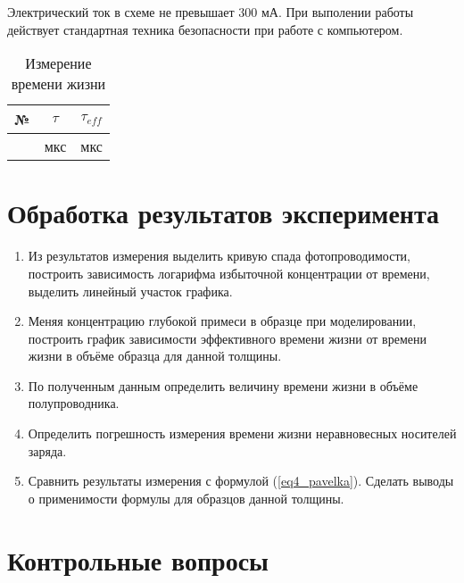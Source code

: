 Электрический ток в схеме не превышает 300 мА. При выполении работы действует стандартная техника безопасности при работе с компьютером.

\begin{table}[h!]
\caption{Измерение времени жизни}
\begin{center}
\begin{tabular}{c|c|c}
№ & $\tau$ & $\tau_{eff}$ \\
\hline
& мкс & мкс \\
\hline
\end{tabular}
\end{center}
\label{table4}
\end{table}

\section{Обработка результатов эксперимента}

\begin{enumerate}
\item Из результатов измерения выделить кривую спада фотопроводимости, построить зависимость логарифма избыточной концентрации от времени, выделить линейный участок графика.
\item Меняя концентрацию глубокой примеси в образце при моделировании, построить график зависимости эффективного времени жизни от времени жизни в объёме образца для данной толщины.
\item По полученным данным определить величину времени жизни в объёме полупроводника.
\item Определить погрешность измерения времени жизни неравновесных носителей заряда.
\item Сравнить результаты измерения с формулой (\ref{eq4_pavelka}). Сделать выводы о применимости формулы для образцов данной толщины.
\end{enumerate}

\section{Контрольные вопросы}

